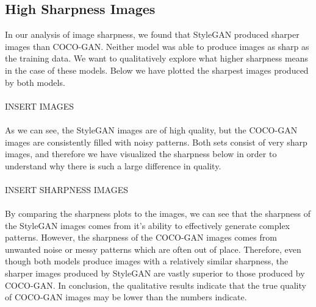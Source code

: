 \documentclass[10pt]{article}
\begin{document}
\begin{multicols*}{2}
        \subsection{High Sharpness Images}
        In our analysis of image sharpness, we found that StyleGAN produced sharper images than COCO-GAN.
        Neither model was able to produce images as sharp as the training data.
        We want to qualitatively explore what higher sharpness means in the case of these models.
        Below we have plotted the sharpest images produced by both models.
        \\\\
        INSERT IMAGES
        \\\\
        As we can see, the StyleGAN images are of high quality, but the COCO-GAN images are consistently filled with noisy patterns.
        Both sets consist of very sharp images, and therefore we have visualized the sharpness below in order to understand why there is such a large difference in quality.
        \\\\
        INSERT SHARPNESS IMAGES
        \\\\
        By comparing the sharpness plots to the images, we can see that the sharpness of the StyleGAN images comes from it's ability to effectively generate complex patterns.
        However, the sharpness of the COCO-GAN images comes from unwanted noise or messy patterns which are often out of place.
        Therefore, even though both models produce images with a relatively similar sharpness, the sharper images produced by StyleGAN are vastly superior to those produced by COCO-GAN.
        In conclusion, the qualitative results indicate that the true quality of COCO-GAN images may be lower than the numbers indicate.
    \end{multicols*}
\end{document}
